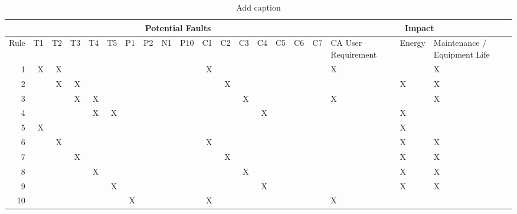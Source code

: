 \begin{table}[htbp]
  \centering
  \caption{Add caption}
    \begin{tabular}{rrrrrrrrrrrrrrrrrp{}p{}p{}}
    \toprule
          & \multicolumn{16}{c}{Potential Faults}                                                                                         & \multicolumn{3}{c}{Impact} \\
    \midrule
    Rule  & T1    & T2    & T3    & T4    & T5    & P1    & P2    & N1    & P10   & C1    & C2    & C3    & C4    & C5    & C6    & C7    & CA User Requirement & Energy & Maintenance / Equipment Life \\
    \midrule
    1     & X     & X     &       &       &       &       &       &       &       & X     &       &       &       &       &       &       & X     &       & X \\
    2     &       & X     & X     &       &       &       &       &       &       &       & X     &       &       &       &       &       &       & X     & X \\
    3     &       &       & X     & X     &       &       &       &       &       &       &       & X     &       &       &       &       & X     &       & X \\
    4     &       &       &       & X     & X     &       &       &       &       &       &       &       & X     &       &       &       &       & X     &  \\
    5     & X     &       &       &       &       &       &       &       &       &       &       &       &       &       &       &       &       & X     &  \\
    6     &       & X     &       &       &       &       &       &       &       & X     &       &       &       &       &       &       &       & X     & X \\
    7     &       &       & X     &       &       &       &       &       &       &       & X     &       &       &       &       &       &       & X     & X \\
    8     &       &       &       & X     &       &       &       &       &       &       &       & X     &       &       &       &       &       & X     & X \\
    9     &       &       &       &       & X     &       &       &       &       &       &       &       & X     &       &       &       &       & X     & X \\
    10    &       &       &       &       &       & X     &       &       &       & X     &       &       &       &       &       &       & X     &       &  \\

\end{tabular}
\end{table}
